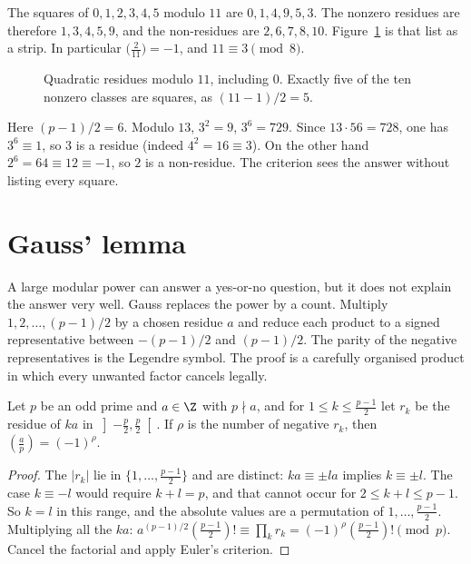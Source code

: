 \begin{examplex}
The squares of $0,1,2,3,4,5$ modulo $11$ are $0,1,4,9,5,3$.
The nonzero residues are therefore $1,3,4,5,9$, and the non-residues are $2,6,7,8,10$.
Figure~\ref{fig:t1-residues} is that list as a strip. In particular $\bigl(\frac{2}{11}\bigr)=-1$, and $11\equiv 3\pmod 8$.
\end{examplex}

\begin{figure}[ht]
\centering
{}
\caption{Quadratic residues modulo $11$, including $0$. Exactly five of the ten nonzero classes are squares, as $(11-1)/2=5$.}
\label{fig:t1-residues}
\end{figure}

\begin{examplex}[Euler's criterion for $p=13$]
Here $(p-1)/2=6$. Modulo $13$, $3^2=9$, $3^6=729$. Since $13\cdot 56=728$, one has $3^6\equiv 1$, so $3$ is a residue (indeed $4^2=16\equiv 3$). On the other hand $2^6=64\equiv 12\equiv -1$, so $2$ is a non-residue. The criterion sees the answer without listing every square.
\end{examplex}

\section{Gauss' lemma}

A large modular power can answer a yes-or-no question, but it does not explain the answer very well. Gauss replaces the power by a count. Multiply $1,2,\ldots,(p-1)/2$ by a chosen residue $a$ and reduce each product to a signed representative between $-(p-1)/2$ and $(p-1)/2$. The parity of the negative representatives is the Legendre symbol. The proof is a carefully organised product in which every unwanted factor cancels legally.

\begin{theorem}\label{thm:gausslemma}
Let $p$ be an odd prime and $a\in\Z$ with $p\nmid a$, and for $1\le k\le\frac{p-1}2$ let $r_k$ be the residue of $ka$ in $\left]-\frac p2,\frac p2\right[$. If $\rho$ is the number of negative $r_k$, then $\left(\frac ap\right)=(-1)^\rho$.
\end{theorem}
\begin{proof}
The $|r_k|$ lie in $\{1,\dots,\frac{p-1}2\}$ and are distinct: $ka\equiv\pm la$ implies $k\equiv\pm l$. The case $k\equiv -l$ would require $k+l=p$, and that cannot occur for $2\le k+l\le p-1$. So $k=l$ in this range, and the absolute values are a permutation of $1,\dots,\frac{p-1}2$. Multiplying all the $ka$:
$a^{(p-1)/2}\left(\frac{p-1}2\right)!\equiv\prod_kr_k=(-1)^\rho\left(\frac{p-1}2\right)!\pmod p$. Cancel the factorial and apply Euler's criterion.
\end{proof}

